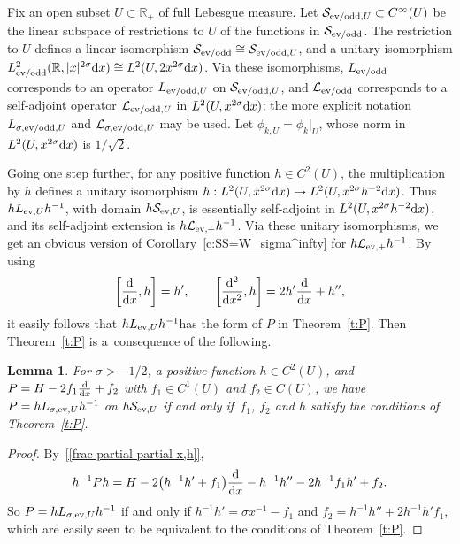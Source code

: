 \documentclass[11pt]{article}
\newtheorem{Lemma}[Theorem]{Lemma}
\newcommand{\R}{\mathbb{R}}
\newcommand{\LL}{\mathcal{L}}
\renewcommand{\SS}{\mathcal{S}}
\newcommand{\Cinf}{C^\infty}
\begin{document}
Fix an open subset $U\subset\R_+$ of full Lebesgue measure. Let $\SS_{\text{\rm ev/odd},U}\subset\Cinf(U)$ be the linear subspace of restrictions to $U$ of the functions in $\SS_{\text{\rm ev/odd}}$. The restriction to $U$ def\/ines a linear isomorphism $\SS_{\text{\rm ev/odd}}\cong\SS_{\text{\rm ev/odd},U}$, and a unitary isomorphism $L^2_{\text{\rm ev/odd}}(\R,|x|^{2\sigma}{\rm d}x)\cong L^2(U,2x^{2\sigma}{\rm d}x)$. Via these isomorphisms, $L_{\text{\rm ev/odd}}$ corresponds to an operator $L_{\text{\rm ev/odd},U}$ on $\SS_{\text{\rm ev/odd},U}$, and $\LL_{\text{\rm ev/odd}}$ corresponds to a self-adjoint operator $\LL_{\text{\rm ev/odd},U}$ in $L^2(U,x^{2\sigma}{\rm d}x)$; the more explicit notation $L_{\sigma,\text{\rm ev/odd},U}$ and $\LL_{\sigma,\text{\rm ev/odd},U}$ may be used. Let $\phi_{k,U}=\phi_k|_U$, whose norm in $L^2(U,x^{2\sigma}{\rm d}x)$ is $1/\sqrt{2}$.

Going one step further, for any positive function $h\in C^2(U)$, the multiplication by $h$ def\/ines a unitary isomorphism $h:L^2(U,x^{2\sigma}{\rm d}x)\to L^2(U,x^{2\sigma}h^{-2}{\rm d}x)$. Thus $hL_{\text{\rm ev},U}h^{-1}$, with domain $h \SS_{\text{\rm ev},U}$, is essentially self-adjoint in $L^2(U,x^{2\sigma}h^{-2}{\rm d}x)$, and its self-adjoint extension is $h\LL_{\text{\rm ev},+}h^{-1}$. Via these unitary isomorphisms, we get an obvious version of Corollary~\ref{c:SS=W_sigma^infty} for $h\LL_{\text{\rm ev},+}h^{-1}$. By using
  \begin{gather}\label{[frac partial partial x,h]}
    \left[\frac{{\rm d}}{{\rm d}x},h\right]=h' ,\qquad
    \left[\frac{{\rm d}^2}{{\rm d}x^2},h\right]=2h'\frac{{\rm d}}{{\rm d}x}+h'' ,
  \end{gather}
it easily follows that $hL_{\text{\rm ev},U}h^{-1}$has the form of $P$ in Theorem~\ref{t:P}. Then Theorem~\ref{t:P} is a~consequence of the following.

\begin{Lemma}\label{l:P}
  For $\sigma>-1/2$, a positive function $h\in C^2(U)$, and $P=H-2f_1 \frac{{\rm d}}{{\rm d}x}+f_2$ with $f_1\in C^1(U)$ and $f_2\in C(U)$, we have $P=hL_{\sigma,\text{\rm ev},U}h^{-1}$ on $h \SS_{\text{\rm ev},U}$ if and only if~$f_1$, $f_2$ and $h$ satisfy the conditions of Theorem~{\rm \ref{t:P}}.
\end{Lemma}

\begin{proof}
  By~\eqref{[frac partial partial x,h]},
    \[
      h^{-1}Ph=H-2\big(h^{-1}h'+f_1\big)\frac{{\rm d}}{{\rm d}x}-h^{-1}h''-2h^{-1}f_1h'+f_2 .
    \]
  So $P=hL_{\sigma,\text{\rm ev},U}h^{-1}$ if and only if $h^{-1}h'=\sigma x^{-1}-f_1$ and $f_2=h^{-1}h''+2h^{-1}h'f_1$, which are easily seen to be equivalent to the conditions of Theorem~\ref{t:P}.
\end{proof}
\end{document}

